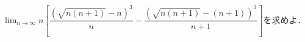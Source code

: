 \documentclass[../../main.tex]{subfiles}
\begin{document}
$\displaystyle\lim_{n\to\infty} n \left[ \dfrac{ { (\sqrt{n(n+1)}-n) }^3 }{n} -
\dfrac{ { (\sqrt{n(n+1)}-(n+1)) }^3 }{n+1} \right]$を求めよ．
\end{document}
